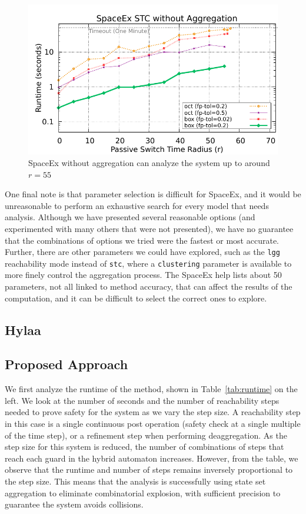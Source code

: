 \begin{figure}[t]
\centerline{\includegraphics[width=0.9\columnwidth]{images/unagg.pdf}}
\caption{SpaceEx without aggregation can analyze the system up to around $r=55$}
\label{fig:spaceex_unagg}
\end{figure}

One final note is that parameter selection is difficult for SpaceEx, and it would be unreasonable to perform an exhaustive search for every model
that needs analysis.
%
Although we have presented several reasonable options (and experimented with many others that were not presented), we have no guarantee that
the combinations of options we tried were the fastest or most accurate.
%
Further, there are other parameters we could have explored, such as the \texttt{lgg} reachability mode instead of \texttt{stc}, where a \texttt{clustering}
parameter is available to more finely control the aggregation process.
%
The SpaceEx help lists about 50 parameters, not all linked to method accuracy, that can affect the results of the computation,
and it can be difficult to select the correct ones to explore.

\subsection{Hylaa}

\subsection{Proposed Approach}


We first analyze the runtime of the method, shown in Table~\ref{tab:runtime} on the left.
%
We look at the number of seconds and the number of reachability steps needed to prove safety for the system as we vary the step size.
%
A reachability step in this case is a single continuous post operation (safety check at a single multiple of the time step), or a refinement step when performing deaggregation.
%
As the step size for this system is reduced, the number of combinations of steps that reach each guard in the hybrid automaton increases.
%
However, from the table, we observe that the runtime and number of steps remains inversely proportional to the step size.
%
This means that the analysis is successfully using state set aggregation to eliminate combinatorial explosion, with sufficient
precision to guarantee the system avoids collisions. 

